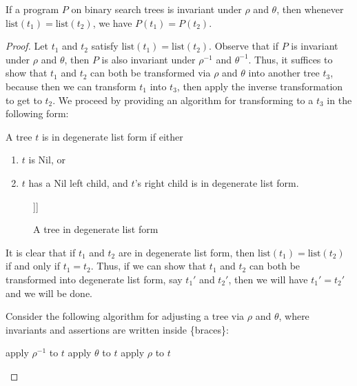 \documentclass{llncs}
\newcommand{\e}{\emptyset}
\begin{document}
\begin{theorem}
  If a program $P$ on binary search trees is invariant under $\rho$
  and $\theta$, then whenever $\mathrm{list}(t_1) = \mathrm{list}(t_2)$,
  we have $P(t_1) = P(t_2)$.
\end{theorem}
\begin{proof}
  Let $t_1$ and $t_2$ satisfy $\mathrm{list}(t_1) = \mathrm{list}(t_2)$.
  Observe that if $P$ is invariant under $\rho$ and $\theta$,
  then $P$ is also invariant under $\rho^{-1}$ and $\theta^{-1}$.
  Thus, it suffices to show that $t_1$ and $t_2$ can both be transformed
  via $\rho$ and $\theta$ into another tree $t_3$,
  because then we can transform $t_1$ into $t_3$, then apply the inverse
  transformation to get to $t_2$.
  We proceed by providing an algorithm for transforming to a $t_3$
  in the following form:

  \begin{definition}
    A tree $t$ is in degenerate list form if either
    \begin{enumerate}
      \item $t$ is Nil, or
      \item $t$ has a Nil left child, and $t$'s right child is in degenerate
        list form.
    \end{enumerate}
  \end{definition}

  \begin{figure}[H]
    \Tree [.a $\e$ [.b $\e$ [.c $\e$ d ]]]
    \caption{A tree in degenerate list form}
  \end{figure}

  It is clear that if $t_1$ and $t_2$ are in degenerate list form, then
  $\mathrm{list}(t_1) = \mathrm{list}(t_2)$ if and only if $t_1 = t_2$.
  Thus, if we can show that $t_1$ and $t_2$ can both be transformed into
  degenerate list form, say $t_1'$ and $t_2'$, then we will have $t_1' = t_2'$
  and we will be done.

  Consider the following algorithm for adjusting a tree via $\rho$ and $\theta$,
  where invariants and assertions are written inside \{braces\}:
  \begin{algorithm}[H]
    \begin{algorithmic}[1]
          \State apply $\rho^{-1}$ to $t$
        \EndWhile
         \label{null-right}
          \label{inner-loop}
            \State apply $\theta$ to $t$
          \EndWhile
            \label{null-left-right}
          \State apply $\rho$ to $t$ \label{apply-rho}
        \EndWhile
         \label{postcond}
      \EndFunction
    \end{algorithmic}
  \end{algorithm} 


\end{proof}
\end{document}

